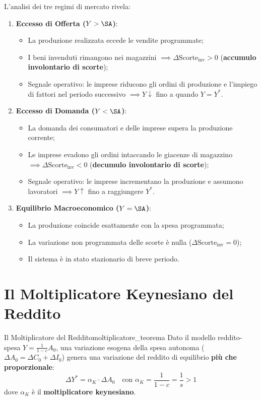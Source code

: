 L'analisi dei tre regimi di mercato rivela:
\begin{enumerate}
    \item \textbf{Eccesso di Offerta ($Y > \SA$)}:
    \begin{itemize}
        \item La produzione realizzata eccede le vendite programmate;
        \item I beni invenduti rimangono nei magazzini $\implies \Delta \mathrm{Scorte}_{\text{inv}} > 0$ (\textbf{accumulo involontario di scorte});
        \item Segnale operativo: le imprese riducono gli ordini di produzione e l'impiego di fattori nel periodo successivo $\implies Y \downarrow$ fino a quando $Y = Y^*$.
    \end{itemize}
    
    \item \textbf{Eccesso di Domanda ($Y < \SA$)}:
    \begin{itemize}
        \item La domanda dei consumatori e delle imprese supera la produzione corrente;
        \item Le imprese evadono gli ordini intaccando le giacenze di magazzino $\implies \Delta \mathrm{Scorte}_{\text{inv}} < 0$ (\textbf{decumulo involontario di scorte});
        \item Segnale operativo: le imprese incrementano la produzione e assumono lavoratori $\implies Y \uparrow$ fino a raggiungere $Y^*$.
    \end{itemize}
    
    \item \textbf{Equilibrio Macroeconomico ($Y = \SA$)}:
    \begin{itemize}
        \item La produzione coincide esattamente con la spesa programmata;
        \item La variazione non programmata delle scorte è nulla ($\Delta \mathrm{Scorte}_{\text{inv}} = 0$);
        \item Il sistema è in stato stazionario di breve periodo.
    \end{itemize}
\end{enumerate}

\section{Il Moltiplicatore Keynesiano del Reddito}

\begin{teorema}{Il Moltiplicatore del Reddito}{moltiplicatore_teorema}
Dato il modello reddito-spesa $Y = \frac{1}{1 - c} A_0$, una variazione esogena della spesa autonoma ($\Delta A_0 = \Delta C_0 + \Delta I_0$) genera una variazione del reddito di equilibrio \textbf{più che proporzionale}:
\begin{equation}
    \Delta Y^* = \alpha_K \cdot \Delta A_0 \quad \text{con } \alpha_K = \frac{1}{1 - c} = \frac{1}{s} > 1
\end{equation}
dove $\alpha_K$ è il \textbf{moltiplicatore keynesiano}.
\end{teorema}

